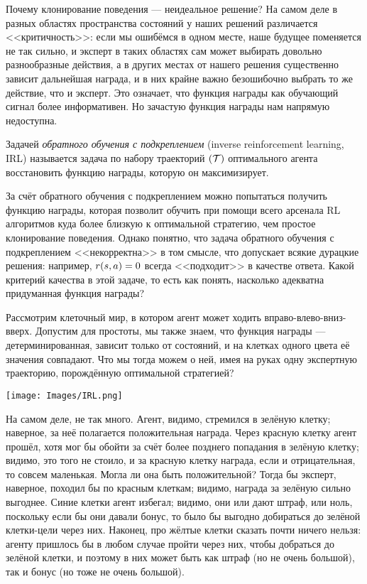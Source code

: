 Почему клонирование поведения --- неидеальное решение? На самом деле в разных областях пространства состояний у наших решений различается <<критичность>>: если мы ошибёмся в одном месте, наше будущее поменяется не так сильно, и эксперт в таких областях сам может выбирать довольно разнообразные действия, а в других местах от нашего решения существенно зависит дальнейшая награда, и в них крайне важно безошибочно выбрать то же действие, что и эксперт. Это означает, что функция награды как обучающий сигнал более информативен. Но зачастую функция награды нам напрямую недоступна. 

\begin{definition}
Задачей \emph{обратного обучения с подкреплением} (inverse reinforcement learning, IRL) называется задача по набору траекторий $(\mathcal{T})$ оптимального агента восстановить функцию награды, которую он максимизирует.
\end{definition}

За счёт обратного обучения с подкреплением можно попытаться получить функцию награды, которая позволит обучить при помощи всего арсенала RL алгоритмов куда более близкую к оптимальной стратегию, чем простое клонирование поведения. Однако понятно, что задача обратного обучения с подкреплением <<некорректна>> в том смысле, что допускает всякие дурацкие решения: например, $r(s, a) \HM= 0$ всегда <<подходит>> в качестве ответа. Какой критерий качества в этой задаче, то есть как понять, насколько адекватна придуманная функция награды?

\begin{example}
Рассмотрим клеточный мир, в котором агент может ходить вправо-влево-вниз-вверх. Допустим для простоты, мы также знаем, что функция награды --- детерминированная, зависит только от состояний, и на клетках одного цвета её значения совпадают. Что мы тогда можем о ней, имея на руках одну экспертную траекторию, порождённую оптимальной стратегией?
\begin{center}
    \texttt{[image: Images/IRL.png]}
\end{center}
На самом деле, не так много. Агент, видимо, стремился в зелёную клетку; наверное, за неё полагается положительная награда. Через красную клетку агент прошёл, хотя мог бы обойти за счёт более позднего попадания в зелёную клетку; видимо, это того не стоило, и за красную клетку награда, если и отрицательная, то совсем маленькая. Могла ли она быть положительной? Тогда бы эксперт, наверное, походил бы по красным клеткам; видимо, награда за зелёную сильно выгоднее. Синие клетки агент избегал; видимо, они или дают штраф, или ноль, поскольку если бы они давали бонус, то было бы выгодно добираться до зелёной клетки-цели через них. Наконец, про жёлтые клетки сказать почти ничего нельзя: агенту пришлось бы в любом случае пройти через них, чтобы добраться до зелёной клетки, и поэтому в них может быть как штраф (но не очень большой), так и бонус (но тоже не очень большой).
\end{example}

